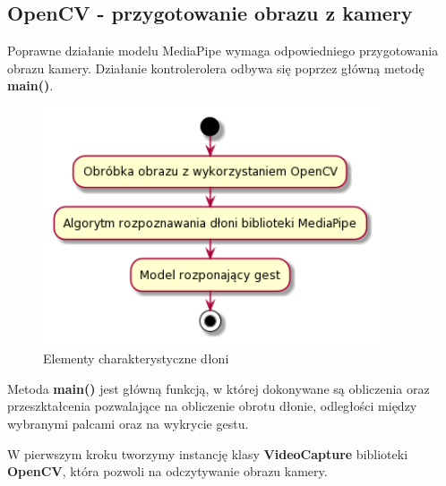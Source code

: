    \subsection{OpenCV - przygotowanie obrazu z kamery}
    
    \quad Poprawne działanie modelu MediaPipe wymaga odpowiedniego przygotowania obrazu kamery. Działanie kontrolerolera odbywa się poprzez główną metodę \textbf{main()}.
    
    \begin{figure}[H]
        \begin{center}
            \includegraphics[width=10cm]{../images/image_processing.png}
            \caption{Elementy charakterystyczne dłoni}
        \end{center}
    \end{figure}

    \quad Metoda \textbf{main()} jest główną funkcją, w której dokonywane są obliczenia oraz przeszktałcenia pozwalające na obliczenie obrotu dłonie, odległości między wybranymi palcami oraz na wykrycie gestu. 
    
    
    
    \quad W pierwszym kroku tworzymy instancję klasy \textbf{VideoCapture} biblioteki \textbf{OpenCV}, która pozwoli na odczytywanie obrazu kamery. 
    
    
